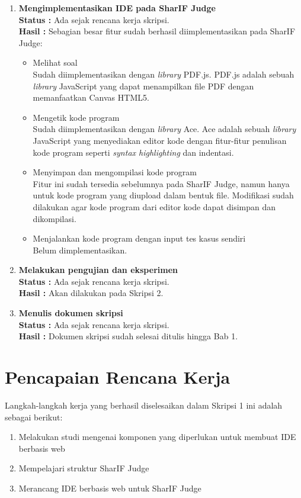 \documentclass[a4paper,twoside]{article}
\begin{document}
\begin{enumerate}
		\item \textbf{Mengimplementasikan IDE pada SharIF Judge}\\
		{\bf Status :} Ada sejak rencana kerja skripsi.\\
		{\bf Hasil :} Sebagian besar fitur sudah berhasil diimplementasikan pada SharIF Judge:
		\begin{itemize}
			\item Melihat soal\\
				Sudah diimplementasikan dengan \textit{library} PDF.js. PDF.js adalah sebuah \textit{library} JavaScript yang dapat menampilkan file PDF dengan memanfaatkan Canvas HTML5.
			\item Mengetik kode program\\
				Sudah diimplementasikan dengan \textit{library} Ace. Ace adalah sebuah \textit{library} JavaScript yang menyediakan editor kode dengan fitur-fitur penulisan kode program seperti \textit{syntax highlighting} dan indentasi.
			\item Menyimpan dan mengompilasi kode program\\
				Fitur ini sudah tersedia sebelumnya pada SharIF Judge, namun hanya untuk kode program yang diupload dalam bentuk file. Modifikasi sudah dilakukan agar kode program dari editor kode dapat disimpan dan dikompilasi.
			\item Menjalankan kode program dengan input tes kasus sendiri\\
				Belum dimplementasikan.
				
		\end{itemize}

		\item \textbf{Melakukan pengujian dan eksperimen}\\
		{\bf Status :} Ada sejak rencana kerja skripsi.\\
		{\bf Hasil :} Akan dilakukan pada Skripsi 2.

		\item \textbf{Menulis dokumen skripsi}\\
		{\bf Status :} Ada sejak rencana kerja skripsi.\\
		{\bf Hasil :} Dokumen skripsi sudah selesai ditulis hingga Bab 1.


	\end{enumerate}

\section{Pencapaian Rencana Kerja}
Langkah-langkah kerja yang berhasil diselesaikan dalam Skripsi 1 ini adalah sebagai berikut:
\begin{enumerate}
	\item Melakukan studi mengenai komponen yang diperlukan untuk membuat IDE berbasis web
	\item Mempelajari struktur SharIF Judge
	\item Merancang IDE berbasis web untuk SharIF Judge
\end{enumerate}
\end{document}
